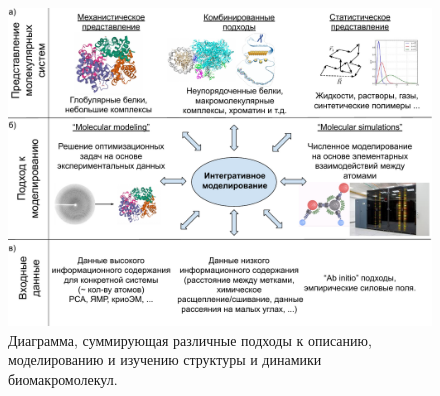 \begin{figure}[H] 
  \center
  \includegraphics [width=\textwidth] {images/p1/concept_matrix.pdf}
  \caption{Диаграмма, суммирующая различные подходы к описанию, моделированию и изучению структуры и динамики биомакромолекул.} 
  \label{fig:p1:concept_matrix}
\end{figure}



